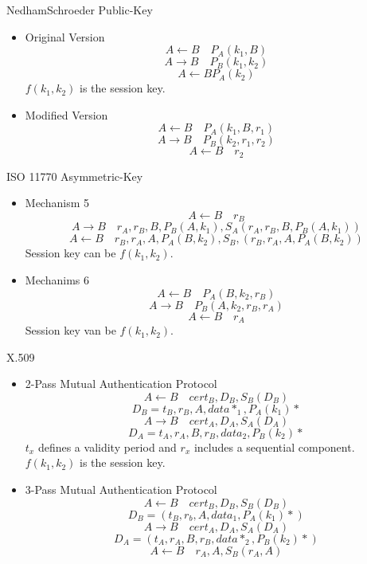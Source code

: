 Nedham\text{-}Schroeder Public-Key
\begin{itemize}
    \item Original Version
        $$ A \leftarrow B \quad P_A(k_1,B)  $$
        $$ A \rightarrow B \quad P_B(k_1,k_2) $$
        $$ A \leftarrow B P_A(k_2) $$
        $f(k_1,k_2)$ is the session key.
    \item Modified Version
        $$ A \leftarrow B \quad P_A(k_1,B,r_1) $$
        $$ A \rightarrow B \quad P_B(k_2,r_1,r_2) $$
        $$ A \leftarrow B \quad r_2 $$
\end{itemize}

ISO 11770\text{-} Asymmetric-Key
\begin{itemize}
    \item Mechanism 5
        $$ A \leftarrow B \quad r_B $$
        $$ A \rightarrow B \quad r_A,r_B,B,P_B(A,k_1),S_A(r_A,r_B,B,P_B(A,k_1))$$
        $$ A \leftarrow B \quad r_B,r_A,A,P_A(B,k_2),S_B,(r_B,r_A,A,P_A(B,k_2))$$
        Session key can be $f(k_1,k_2)$.
    \item Mechanims 6
        $$ A \leftarrow B \quad P_A(B,k_2,r_B) $$
        $$ A \rightarrow B \quad P_B(A,k_2,r_B,r_A) $$
        $$ A \leftarrow B \quad r_A $$
        Session key van be $f(k_1,k_2)$.
\end{itemize}
X.509
\begin{itemize}
    \item 2-Pass Mutual Authentication Protocol
        $$ A \leftarrow B \quad cert_B,D_B,S_B(D_B) $$
        $$ D_B = t_B,r_B,A,data*_1,P_A(k_1)* $$
        $$ A \rightarrow B \quad cert_A,D_A,S_A(D_A) $$
        $$ D_A = t_A,r_A,B,r_B,data_2,P_B(k_2)* $$
        $t_x$ defines a validity period and $r_x$ includes a sequential component.
        $f(k_1,k_2)$ is the session key.
    \item 3-Pass Mutual Authentication Protocol
        $$ A \leftarrow B \quad cert_B,D_B,S_B(D_B) $$
        $$ D_B = (t_B,r_b,A,data_1,P_A(k_1)*) $$
        $$ A \rightarrow B \quad cert_A,D_A,S_A(D_A) $$
        $$ D_A = (t_A,r_A,B,r_B,data*_2,P_B(k_2)*) $$
        $$ A \leftarrow B \quad r_A,A,S_B(r_A,A) $$
\end{itemize}

